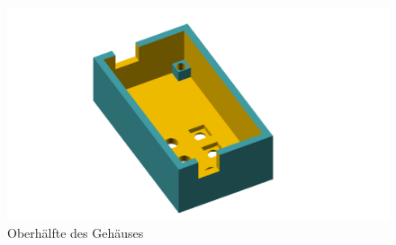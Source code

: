 \documentclass[a4paper, 12pt]{article}
\begin{document}
      \begin{center}
        \begin{figure}[H]
        \includegraphics[page=1, scale=0.5]{graphics/Gehaeuse_top_test.png}
        \caption{Oberhälfte des Gehäuses}
        \label{fig:3d2}
        \end{figure}
      \end{center}
\end{document}
